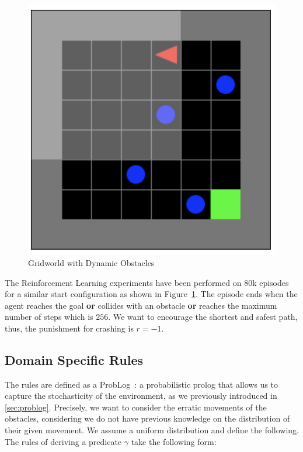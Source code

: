 \begin{multicols}{2}[\medskip]
    \begin{figure}[H]
      \centering
      \includegraphics[scale=0.55]{figures/gridworldrl.png}
      \caption{Gridworld with Dynamic Obstacles}
      \label{fig:gridrl}
    \end{figure}
    \columnbreak
    The Reinforcement Learning experiments have been performed on 80k 
    episodes for a similar start configuration as shown in Figure~\ref{fig:gridrl}. The episode ends when the agent 
    reaches the goal \textbf{or} collides with an obstacle \textbf{or} reaches the maximum number of steps which is $256$. We want to encourage the shortest and safest path, thus, the punishment for crashing is $r = -1$. 
\end{multicols}

\subsection{Domain Specific Rules}
The rules are defined as a ProbLog~\cite{problog}: a probabilistic prolog that allows us to capture 
the stochasticity of the environment, as we previously introduced in \ref{sec:problog}. Precisely, we want to consider the erratic movements of the obstacles, considering 
we do not have previous knowledge on the distribution of their given movement. We assume a uniform distribution and define the following. 
The rules of \dio{} deriving a predicate $\gamma$ take the following form: 

